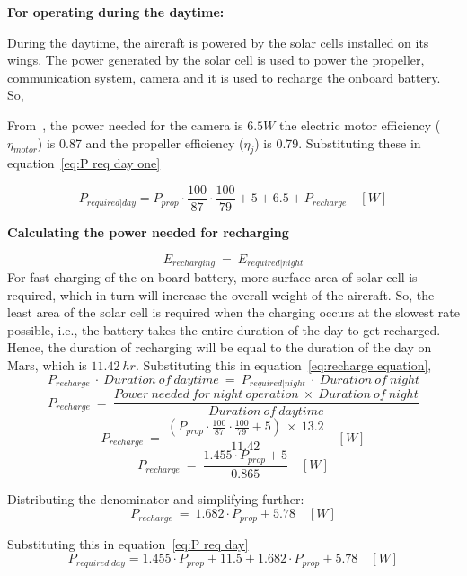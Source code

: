 \p \textbf{For operating during the daytime:}

\p During the daytime, the aircraft is powered by the solar cells installed on its wings. The power generated by the solar cell is used to power the propeller, communication system, camera and it is used to recharge the onboard battery.\\
\p So,

\p From~\cite{Manual}, the power needed for the camera is $6.5 W$ the electric motor efficiency ($\eta_{motor}$) is 0.87 and the propeller efficiency ($\eta_j$) is 0.79. Substituting these in equation~\ref{eq:P req day one}

\[ P_{required|day} = P_{prop} \cdot \frac{100}{87} \cdot \frac{100}{79} + 5 + 6.5 + P_{recharge} \quad [W] \]

\p \textbf{Calculating the power needed for recharging}

\vspace{0.2cm}

\[ E_{recharging} \ = \ E_{required|night} \]
\p For fast charging of the on-board battery, more surface area of solar cell is required, which in turn will increase the overall weight of the aircraft. So, the least area of the solar cell is required when the charging occurs at the slowest rate possible, i.e., the battery takes the entire duration of the day to get recharged. Hence, the duration of recharging will be equal to the duration of the day on Mars, which is $ 11.42 \ hr $. Substituting this in equation~\ref{eq:recharge equation},
\[ P_{recharge} \ \cdot \ Duration \ of \ daytime \ = \ P_{required | night} \ \cdot \ Duration \ of \ night \]
\[ P_{recharge} \ = \ \frac{ Power \ needed \ for \ night \ operation \ \times \ Duration \ of \ night }{ Duration \ of \ daytime } \]
\[ P_{recharge} \ = \ \frac{ \left(P_{prop} \cdot \frac{100}{87} \cdot \frac{100}{79} + 5 \right) \ \times \ 13.2 }{ 11.42 } \quad [W] \]
\[ P_{recharge} \ = \ \frac{ 1.455 \cdot P_{prop} + 5 }{ 0.865 } \quad [W] \]

\p Distributing the denominator and simplifying further:
\[ P_{recharge} \ = \ 1.682 \cdot P_{prop} + 5.78 \quad [W] \]

\p Substituting this in equation~\ref{eq:P req day}
\[ P_{required|day} = 1.455 \cdot P_{prop} + 11.5 + 1.682 \cdot P_{prop} + 5.78 \quad [W] \]

